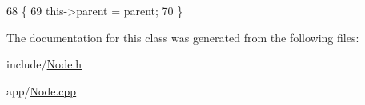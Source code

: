 \begin{DoxyCode}
68                                                \{
69   this->parent = parent;
70 \}
\end{DoxyCode}


The documentation for this class was generated from the following files\+:\begin{DoxyCompactItemize}
\item 
include/\hyperlink{Node_8h}{Node.\+h}\item 
app/\hyperlink{Node_8cpp}{Node.\+cpp}\end{DoxyCompactItemize}

